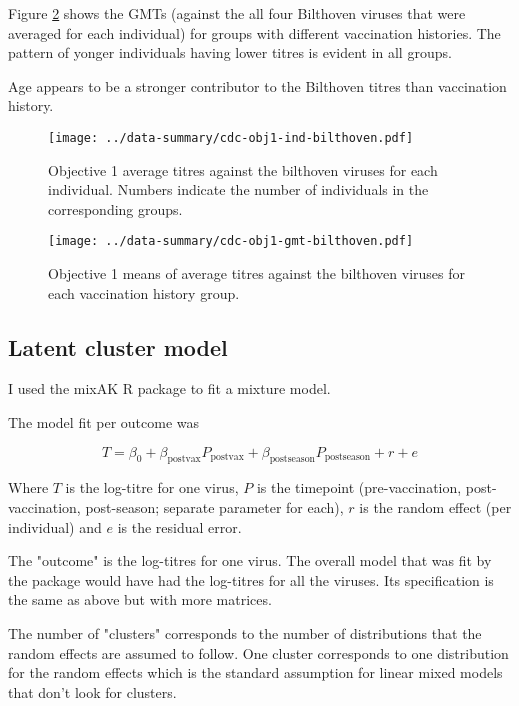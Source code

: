 \documentclass[12pt]{article}
\begin{document}
Figure \ref{fig:cdc-obj1-gmt-bilthoven} shows the GMTs (against the all four Bilthoven viruses that were averaged for each individual) for groups with different vaccination histories. The pattern of yonger individuals having lower titres is evident in all groups.

Age appears to be a stronger contributor to the Bilthoven titres than vaccination history.

\begin{figure}
	\texttt{[image: ../data-summary/cdc-obj1-ind-bilthoven.pdf]}
	\caption{Objective 1 average titres against the bilthoven viruses for each individual. Numbers indicate the number of individuals in the corresponding groups.}
	\label{fig:cdc-obj1-ind-bilthoven}
\end{figure}

\begin{figure}
	\texttt{[image: ../data-summary/cdc-obj1-gmt-bilthoven.pdf]}
	\caption{Objective 1 means of average titres against the bilthoven viruses for each vaccination history group. }
	\label{fig:cdc-obj1-gmt-bilthoven}
\end{figure}

\subsection{Latent cluster model}

I used the mixAK R package to fit a mixture model.

The model fit per outcome was

$$
	T = \beta_0 + \beta_{\text{postvax}}P_{\text{postvax}} + \beta_{\text{postseason}}P_{\text{postseason}} + r + e
$$

Where $T$ is the log-titre for one virus, $P$ is the timepoint (pre-vaccination, post-vaccination, post-season; separate parameter for each), $r$ is the random effect (per individual) and $e$ is the residual error.

The "outcome" is the log-titres for one virus. The overall model that was fit by the package would have had the log-titres for all the viruses. Its specification is the same as above but with more matrices.

The number of "clusters" corresponds to the number of distributions that the random effects are assumed to follow. One cluster corresponds to one distribution for the random effects which is the standard assumption for linear mixed models that don't look for clusters.
\end{document}

